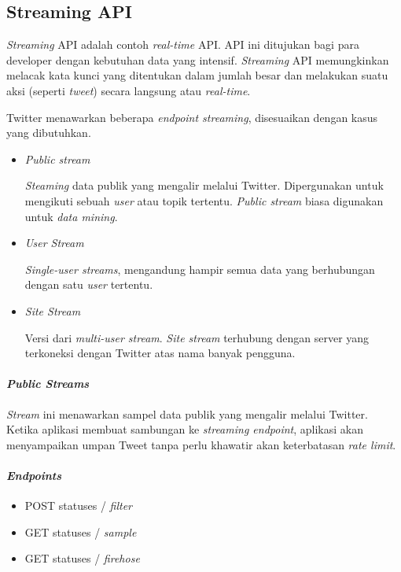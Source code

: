 \subsection{Streaming API}
\textit{Streaming} API adalah contoh \textit{real-time} API. API ini ditujukan bagi para developer dengan kebutuhan data yang intensif. \textit{Streaming} API memungkinkan melacak kata kunci yang ditentukan dalam jumlah besar dan melakukan suatu aksi (seperti \textit{tweet}) secara langsung atau \textit{real-time}.

Twitter menawarkan beberapa \textit{endpoint streaming}, disesuaikan dengan kasus yang dibutuhkan. 
\begin{itemize}
	\item \textit{Public stream}
	
	\textit{Steaming} data publik yang mengalir melalui Twitter. Dipergunakan untuk mengikuti sebuah \textit{user} atau topik tertentu. \textit{Public stream} biasa  digunakan untuk \textit{data mining}.
	\item \textit{User Stream}
	
	\textit{Single-user streams}, mengandung hampir semua data yang berhubungan dengan satu \textit{user} tertentu.
	
	\item \textit{Site Stream}
	
	Versi dari \textit{multi-user stream}. \textit{Site stream} terhubung dengan server yang terkoneksi dengan Twitter atas nama banyak pengguna.
\end{itemize}


\paragraph{\textit{Public Streams}}
\textit{Stream} ini menawarkan sampel data publik yang mengalir melalui Twitter. Ketika aplikasi membuat sambungan ke \textit{streaming endpoint}, aplikasi akan menyampaikan umpan Tweet tanpa perlu khawatir akan keterbatasan \textit{rate limit}.

\paragraph{\textit{Endpoints}}
	
	\begin{itemize}
		\item POST statuses / \textit{filter}
		\item GET statuses / \textit{sample}
		\item GET statuses / \textit{firehose}
	\end{itemize}

